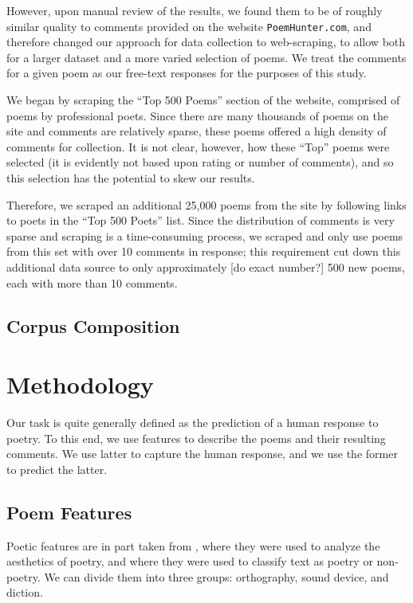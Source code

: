 \documentclass[11pt]{article}
\begin{document}
However, upon manual review of the results, we found them to be of roughly similar quality to comments provided on the website \texttt{PoemHunter.com}, and therefore changed our approach for data collection to web-scraping, to allow both for a larger dataset and a more varied selection of poems. We treat the comments for a given poem as our free-text responses for the purposes of this study.

We began by scraping the ``Top 500 Poems'' section of the website, comprised of poems by professional poets. Since there are many thousands of poems on the site and comments are relatively sparse, these poems offered a high density of comments for collection. It is not clear, however, how these ``Top'' poems were selected (it is evidently not based upon rating or number of comments), and so this selection has the potential to skew our results.

Therefore, we scraped an additional 25,000 poems from the site by following links to poets in the ``Top 500 Poets'' list. Since the distribution of comments is very sparse and scraping is a time-consuming process, we scraped and only use poems from this set with over 10 comments in response; this requirement cut down this additional data source to only approximately [do exact number?] 500 new poems, each with more than 10 comments.

\subsection{Corpus Composition}

\section{Methodology}
Our task is quite generally defined as the prediction of a human response to poetry. To this end, we use features to describe the poems and their resulting comments. We use latter to capture the human response, and we use the former to predict the latter.

\subsection{Poem Features}
Poetic features are in part taken from , where they were used to analyze the aesthetics of poetry, and  where they were used to classify text as poetry or non-poetry. We can divide them into three groups: orthography, sound device, and diction.
\end{document}
